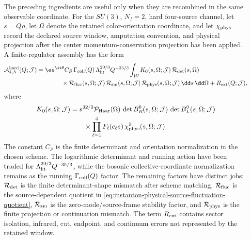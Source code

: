 The preceding ingredients are useful only when they are recombined in the same
observable coordinate.  For the \(SU(3)\), \(N_f=2\), hard four-source channel,
let \(s=Q\rho\), let \(\Omega\) denote the retained color-orientation
coordinate, and let \(\chi_{\rm phys}\) record the declared source window,
amputation convention, and physical projection after the center
momentum-conservation projection has been applied.  A finite-regulator assembly has
the form
\begin{equation}
\begin{aligned}
  \mathcal A_{4,\Lambda}^{\rm hard}(Q;\mathcal J)
  &=
  \ee^{\ii\theta}
  C_{\mathcal S}\,
  \Gamma_{\rm coll}(Q)\,
  \Lambda_{\rm ht}^{29/3}Q^{-35/3}
  \int_{\mathcal W}
  K_0(s,\Omega;\mathcal J)\,
  \mathcal R_{\rm det}(s,\Omega)\,                       \\
  &\qquad\qquad{}\times
  \mathcal R_{\rm fluc}(s,\Omega;\mathcal J)\,
  \mathcal R_{\rm zm}(s,\Omega;\mathcal J)\,
  \mathcal R_{\rm phys}(s,\Omega;\mathcal J)\,
  \dd s\,\dd\Omega
  +R_{\rm ext}(Q;\mathcal J),
\end{aligned}
  \label{eq:instanton-hard-assembled-channel}
\end{equation}
where
\[
\begin{aligned}
  K_0(s,\Omega;\mathcal J)
  &=
  s^{32/3}
  \mathcal P_{\rm Haar}(\Omega)\,
  \det B_R^0(s,\Omega;\mathcal J)\,
  \det B_L^0(s,\Omega;\mathcal J)              \\
  &\qquad{}\times
  \prod_{\ell=1}^4F_\ell(c_\ell s)\,
  \chi_{\rm phys}^{0}(s,\Omega;\mathcal J).
\end{aligned}
\]
The constant \(C_{\mathcal S}\) is the finite determinant and orientation
normalization in the chosen scheme.  The logarithmic determinant and running
action have been traded for \(\Lambda_{\rm ht}^{29/3}Q^{-35/3}\), while the
bosonic collective-coordinate normalization remains as the running
\(\Gamma_{\rm coll}(Q)\) factor.  The remaining factors have distinct jobs:
\(\mathcal R_{\rm det}\) is the finite determinant-shape mismatch after
scheme matching, \(\mathcal R_{\rm fluc}\) is the source-dependent quotient in
\eqref{eq:instanton-physical-source-fluctuation-quotient},
\(\mathcal R_{\rm zm}\) is the zero-mode/source-frame stability factor, and
\(\mathcal R_{\rm phys}\) is the finite projection or continuation mismatch.
The term \(R_{\rm ext}\) contains sector isolation, infrared, cut, endpoint,
and continuum errors not represented by the retained window.

